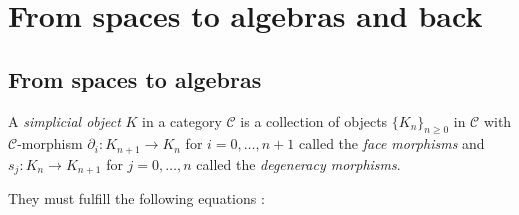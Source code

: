 
 \section{From spaces to algebras and back}
 
 \subsection{From spaces to algebras}
 
 \begin{Definition}
  A \emph{simplicial object} $K$ in a category $\mathscr{C}$
  is a collection of objects ${\lbrace K_n \rbrace}_{n \geq 0}$ in $\mathscr{C}$ with $\mathscr{C}$-morphism
  $\partial_i \colon K_{n+1} \to K_n$ for $i = 0, \ldots, n+1$ called the \emph{face morphisms} and \newline
  $s_j \colon K_n \to K_{n+1}$ for $j = 0, \ldots, n$ called the \emph{degeneracy morphisms}.
  
  They must fulfill the following equations : %
%              
%     
\end{Definition}
